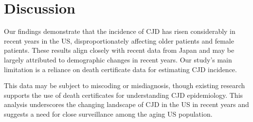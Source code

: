 \documentclass[12pt]{article}
\begin{document}
\newpage

\section*{Discussion}
 
\par \bigskip
\noindent Our findings demonstrate that the incidence of CJD has risen considerably in recent years in the US, disproportionately affecting older patients and female patients. These results align closely with recent data from Japan and may be largely attributed to demographic changes in recent years\cite{SciRep}. Our study’s main limitation is a reliance on death certificate data for estimating CJD incidence.

\par \bigskip
\noindent This data may be subject to miscoding or misdiagnosis, though existing research supports the use of death certificates for understanding CJD epidemiology\cite{NeuroEpi}. This analysis underscores the changing landscape of CJD in the US in recent years and suggests a need for close surveillance among the aging US population.  




\end{document}
